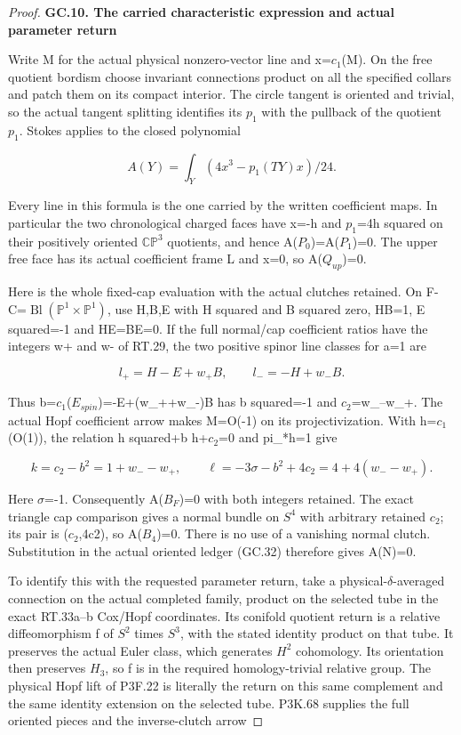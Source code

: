 \begin{proof}
\par

\medskip\noindent\textbf{GC.10. The carried characteristic expression and actual parameter return}

\par\nobreak

Write M for the actual physical nonzero-vector line and x=\(c_1\)(M).
On the free quotient bordism choose invariant connections product on
all the specified collars and patch them on its compact interior.
The circle tangent is oriented and trivial, so the actual tangent
splitting identifies its \(p_1\) with the pullback of the quotient \(p_1\).
Stokes applies to the closed polynomial

\[
                      A(Y)=\int_Y(4x^3-p_1(TY)x)/24.
 \tag{GC.33}
\]

Every line in this formula is the one carried by the written
coefficient maps. In particular the two chronological charged
faces have x=-h and \(p_1\)=4h squared on their positively oriented
\(\mathbb{CP}^3\) quotients, and hence A(\(P_0\))=A(\(P_1\))=0. The upper free face has
its actual coefficient frame L and x=0, so A(\(Q_{up}\))=0.

Here is the whole fixed-cap evaluation with the actual clutches
retained. On F-C=\(\operatorname{Bl}(\mathbb P^1\times\mathbb P^1)\), use H,B,E with H squared and
B squared zero, HB=1, E squared=-1 and HE=BE=0. If the full
normal/cap coefficient ratios have the integers w+ and w- of
RT.29, the two positive spinor line classes for a=1 are

\[
        l_+=H-E+w_+B,\qquad l_-=-H+w_-B.
\]

Thus b=\(c_1\)(\(E_{spin}\))=-E+(w\_++w\_-)B has b squared=-1 and
\(c_2\)=w\_--w\_+. The actual Hopf coefficient arrow makes M=O(-1)
on its projectivization. With h=\(c_1\)(O(1)), the relation
h squared+b h+\(c_2\)=0 and pi\_*h=1 give

\[
 k=c_2-b^2=1+w_--w_+,\qquad
 \ell=-3\sigma-b^2+4c_2=4+4(w_--w_+).
\]

Here \(\sigma\)=-1. Consequently A(\(B_F\))=0 with both integers retained.
The exact triangle cap comparison gives a normal bundle on \(S^4\)
with arbitrary retained \(c_2\); its pair is (\(c_2\),4c2), so A(\(B_4\))=0.
There is no use of a vanishing normal clutch. Substitution in
the actual oriented ledger (GC.32) therefore gives A(N)=0.

To identify this with the requested parameter return, take a
physical-\(\delta\)-averaged connection on the actual completed
family, product on the selected tube in the exact RT.33a--b
Cox/Hopf coordinates. Its conifold quotient return is a
relative diffeomorphism f of \(S^2\) times \(S^3\), with the stated
identity product on that tube. It preserves the actual Euler
class, which generates \(H^2\) cohomology. Its orientation then
preserves \(H_3\), so f is in the required homology-trivial relative
group. The physical Hopf lift of P3F.22 is literally the return
on this same complement and the same identity extension on
the selected tube. P3K.68 supplies the full oriented pieces
and the inverse-clutch arrow


\end{proof}
